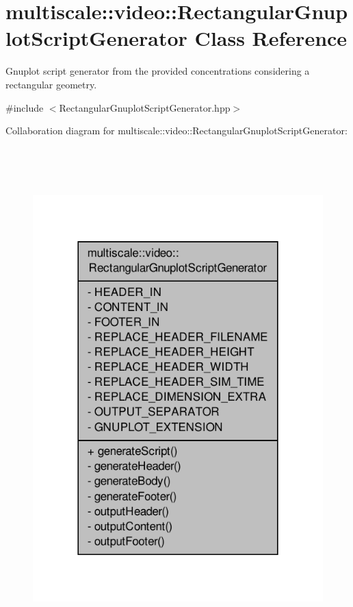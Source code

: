 \hypertarget{classmultiscale_1_1video_1_1RectangularGnuplotScriptGenerator}{\section{multiscale\-:\-:video\-:\-:Rectangular\-Gnuplot\-Script\-Generator Class Reference}
\label{classmultiscale_1_1video_1_1RectangularGnuplotScriptGenerator}
}


Gnuplot script generator from the provided concentrations considering a rectangular geometry.  




{\ttfamily \#include $<$Rectangular\-Gnuplot\-Script\-Generator.\-hpp$>$}



Collaboration diagram for multiscale\-:\-:video\-:\-:Rectangular\-Gnuplot\-Script\-Generator\-:\nopagebreak
\begin{figure}[H]
\begin{center}
\leavevmode
\includegraphics[height=550pt]{classmultiscale_1_1video_1_1RectangularGnuplotScriptGenerator__coll__graph}
\end{center}
\end{figure}
